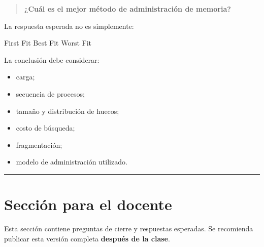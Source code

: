 \documentclass[
  spanish,
  letterpaper,
]{scrbook}
\newenvironment{Shaded}{\begin{snugshade}}{\end{snugshade}}
\newcommand{\NormalTok}[1]{\textcolor[rgb]{0.00,0.23,0.31}{#1}}
\providecommand{\tightlist}{%
  \setlength{\itemsep}{0pt}\setlength{\parskip}{0pt}}
\begin{document}
\begin{quote}
\textbf{¿Cuál es el mejor método de administración de memoria?}
\end{quote}

La respuesta esperada no es simplemente:

\begin{Shaded}
\begin{Highlighting}[]
\NormalTok{First Fit}
\NormalTok{Best Fit}
\NormalTok{Worst Fit}
\end{Highlighting}
\end{Shaded}

La conclusión debe considerar:

\begin{itemize}
\tightlist
\item
  carga;
\item
  secuencia de procesos;
\item
  tamaño y distribución de huecos;
\item
  costo de búsqueda;
\item
  fragmentación;
\item
  modelo de administración utilizado.
\end{itemize}

\begin{center}\rule{0.5\linewidth}{0.5pt}\end{center}


\chapter{Sección para el docente}\label{secciuxf3n-para-el-docente}

\begin{tcolorbox}[enhanced jigsaw, arc=.35mm, bottomrule=.15mm, bottomtitle=1mm, breakable, colback=white, colbacktitle=quarto-callout-warning-color!10!white, colframe=quarto-callout-warning-color-frame, coltitle=black, left=2mm, leftrule=.75mm, opacityback=0, opacitybacktitle=0.6, rightrule=.15mm, title=\textcolor{quarto-callout-warning-color}{\faExclamationTriangle}\hspace{0.5em}{NO PUBLICAR ANTES DE LA ACTIVIDAD}, titlerule=0mm, toprule=.15mm, toptitle=1mm]

Esta sección contiene preguntas de cierre y respuestas esperadas. Se
recomienda publicar esta versión completa \textbf{después de la clase}.

\end{tcolorbox}
\end{document}
